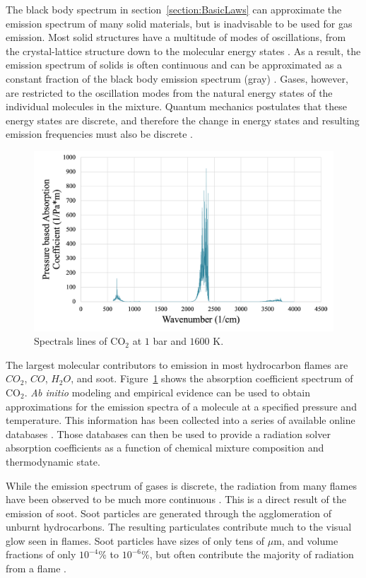 The black body spectrum in section~\ref{section:BasicLaws} can approximate the emission spectrum of many solid materials, but is inadvisable to be used for gas emission. 
Most solid structures have a multitude of modes of oscillations, from the crystal-lattice structure down to the molecular energy states \cite{Viskanta1975HeatSolids}. As a result, the emission spectrum of solids is often continuous and can be approximated as a constant fraction of the black body emission spectrum (gray) \cite{Howell2010ThermalTransfer}. 
Gases, however, are restricted to the oscillation modes from the natural energy states of the individual molecules in the mixture. Quantum mechanics postulates that these energy states are discrete, and therefore the change in energy states and resulting emission frequencies must also be discrete \cite{Hanson2016SpectroscopyGases}.
\begin{figure}
\centering
\includegraphics[width=0.8\linewidth]{figures/ch2/SpectralLinesCO2.png}
\caption{Spectrals lines of CO$_2$ at $1$ bar and $1600$ K.}
\label{fig:SpectralLines}
\end{figure}


The largest molecular contributors to emission in most hydrocarbon flames are $CO_2$, $CO$, $H_2O$, and soot. Figure~\ref{fig:SpectralLines} shows the absorption coefficient spectrum of CO$_2$. 
\textit{Ab initio} modeling and empirical evidence can be used to obtain approximations for the emission spectra of a molecule at a specified pressure and temperature. This information has been collected into a series of available online databases \cite{Rothman2010HITEMPDatabase}. 
Those databases can then be used to provide a radiation solver absorption coefficients as a function of chemical mixture composition and thermodynamic state.

While the emission spectrum of gases is discrete, the radiation from many flames have been observed to be much more continuous \cite{Modest2013RadiativeTransfer}. This is a direct result of the emission of soot.
Soot particles are generated through the agglomeration of unburnt hydrocarbons. The resulting particulates contribute much to the visual glow seen in flames. 
Soot particles have sizes of only tens of $\mu{}$m, and volume fractions of only $10^{-4}$\% to $10^{-6}$\%, but often contribute the majority of radiation from a flame \cite{Modest2013RadiativeTransfer}.

